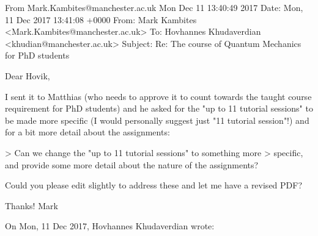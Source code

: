 From Mark.Kambites@manchester.ac.uk Mon Dec 11 13:40:49 2017
Date: Mon, 11 Dec 2017 13:41:08 +0000
From: Mark Kambites <Mark.Kambites@manchester.ac.uk>
To: Hovhannes Khudaverdian <khudian@manchester.ac.uk>
Subject: Re: The course of Quantum Mechanics for PhD students

Dear Hovik,

I sent it to Matthias (who needs to approve it to count towards the taught 
course requirement for PhD students) and he asked for the "up to 11 
tutorial sessions" to be made more specific (I would personally suggest 
just "11 tutorial session"!) and for a bit more detail about the 
assignments:

> Can we change the "up to 11 tutorial sessions" to something more 
> specific, and provide some more detail about the nature of the assignments?

Could you please edit slightly to address these and let me have a revised 
PDF?

Thanks! Mark



On Mon, 11 Dec 2017, Hovhannes Khudaverdian wrote:

